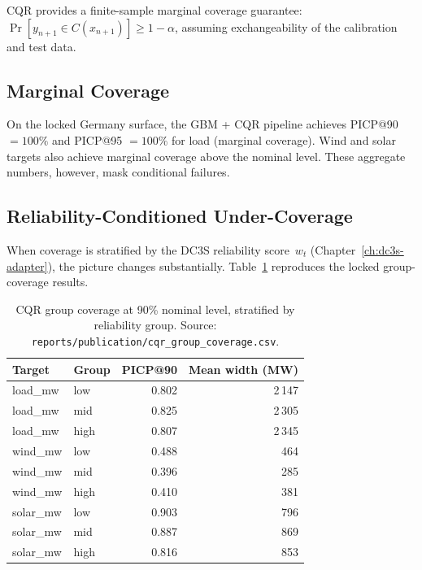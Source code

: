 CQR provides a finite-sample marginal coverage guarantee:
$\Pr[y_{n+1} \in C(x_{n+1})] \ge 1 - \alpha$, assuming exchangeability
of the calibration and test data.

\subsection{Marginal Coverage}

On the locked Germany surface, the GBM + CQR pipeline achieves
PICP@90 $= 100\%$ and PICP@95 $= 100\%$ for load (marginal coverage).
Wind and solar targets also achieve marginal coverage above the nominal
level.  These aggregate numbers, however, mask conditional failures.

\subsection{Reliability-Conditioned Under-Coverage}

When coverage is stratified by the DC3S reliability score~$w_t$
(Chapter~\ref{ch:dc3s-adapter}), the picture changes substantially.
Table~\ref{tab:cqr-group-coverage} reproduces the locked group-coverage
results.

\begin{table}[ht]
\centering
\caption{CQR group coverage at 90\% nominal level, stratified by
reliability group.  Source:
\texttt{reports/publication/cqr\_group\_coverage.csv}.}
\label{tab:cqr-group-coverage}
\begin{tabular}{llrr}
\toprule
\textbf{Target} & \textbf{Group} & \textbf{PICP@90} &
  \textbf{Mean width (MW)} \\
\midrule
load\_mw  & low  & 0.802 & 2\,147 \\
load\_mw  & mid  & 0.825 & 2\,305 \\
load\_mw  & high & 0.807 & 2\,345 \\
\midrule
wind\_mw  & low  & 0.488 & 464 \\
wind\_mw  & mid  & 0.396 & 285 \\
wind\_mw  & high & 0.410 & 381 \\
\midrule
solar\_mw & low  & 0.903 & 796 \\
solar\_mw & mid  & 0.887 & 869 \\
solar\_mw & high & 0.816 & 853 \\
\bottomrule
\end{tabular}
\end{table}

